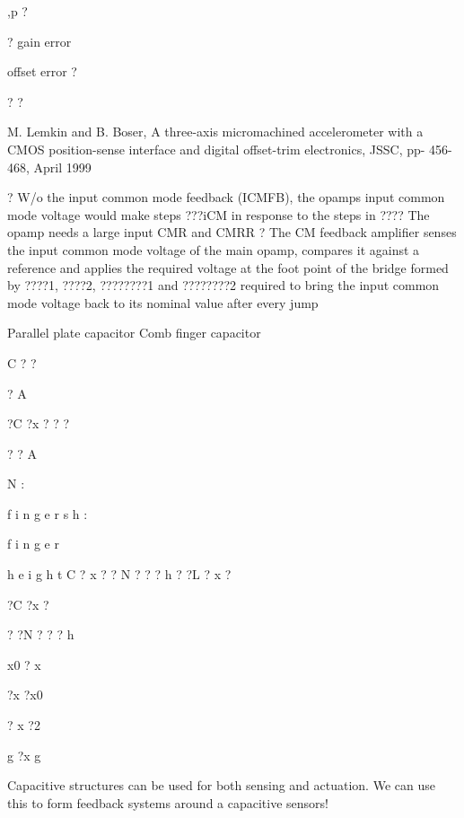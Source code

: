 \documentclass[2pt,landscape]{article}
\begin{document}
\begin{multicols*}{5}
\textbullet ,p ?


?	gain error


offset error	?


?	?














M. Lemkin and B. Boser, \textbullet A three-axis micromachined 
accelerometer with a CMOS position-sense interface and 
digital offset-trim electronics, JSSC, pp- 456-468, April 
1999


?	W/o the input common mode feedback (ICMFB), the opamp\textbullet s input 
common mode voltage would make steps ???iCM in response to the 
steps in ????	The opamp needs a large input CMR and CMRR
?	The CM feedback amplifier senses the input common mode voltage 
of the main opamp, compares it against a reference and applies the 
required voltage at the foot point of the bridge formed by ????1, ????2, ????????1 
and ????????2 required to bring the input common mode voltage back to its 
nominal value after every jump


Parallel plate capacitor	Comb finger capacitor






C ? ?



?	A	



?C ?x 
? ? ? 




? ? A


N
:



f
i
n
g
e
r
s
h
:

f
i
n
g
e
r

h
e
i
g
h
t
C ? x 
? ? N 
? ? ? h 
? ?L ? 
x ?



?C ?x 
?



? ?N ? 
? ? h


x0 ? x


?x	?x0


? x ?2


g	?x	g






Capacitive structures can be used for both sensing and actuation. We can 
use this to form feedback systems around a capacitive sensors!






















\end{multicols*}
\end{document}
